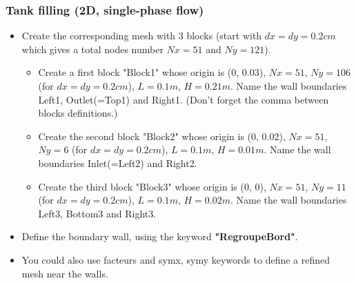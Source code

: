 \documentclass[10pt, hyperref={unicode=true,pdfusetitle, bookmarks=true,bookmarksnumbered=false,bookmarksopen=false, breaklinks=false,pdfborder={0 0l 1},backref=true,colorlinks=true,linkcolor=darkblue,pageanchor}]{beamer}
\begin{document}
\begin{frame}
\frametitle{Tank filling (2D, single-phase flow)}
\begin{block}{}

\begin{itemize}
\item Create the corresponding mesh with 3 blocks (start with $dx=dy=0.2cm$ which gives a total nodes number $Nx=51$ and $Ny=121$). 
    \begin{itemize}
    \item [$\circ$] Create a first block "Block1" whose origin is (0, 0.03), $Nx=51$, $Ny=106$ (for $dx=dy=0.2cm$), $L=0.1 m$, $H=0.21 m$. Name the wall boundaries Left1, Outlet(=Top1) and Right1. (Don't forget the comma between blocks definitions.)
    \item [$\circ$] Create the second block "Block2" whose origin is (0, 0.02), $Nx=51$, $Ny=6$ (for $dx=dy=0.2cm$), $L=0.1 m$, $H=0.01 m$. Name the wall boundaries Inlet(=Left2) and Right2.
    \item [$\circ$] Create the third block "Block3" whose origin is (0, 0), $Nx=51$, $Ny=11$ (for $dx=dy=0.2cm$), $L=0.1 m$, $H=0.02 m$. Name the wall boundaries Left3, Bottom3 and Right3.
    \end{itemize}
\item Define the boundary wall, using the keyword \textbf{"RegroupeBord"}.
\item You could also use facteurs and symx, symy keywords to define a refined mesh near the walls. 
\end{itemize}

\end{block}
\end{frame}
\end{document}
